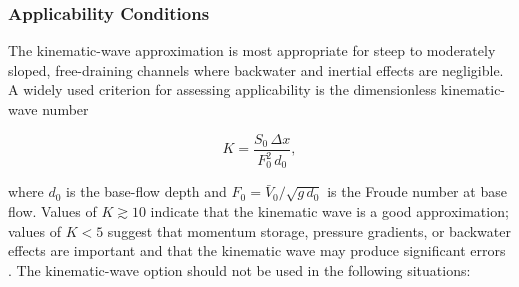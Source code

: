 \subsubsection{Applicability Conditions}

The kinematic-wave approximation is most appropriate for steep to moderately sloped, free-draining channels where backwater and inertial effects are negligible. A widely used criterion for assessing applicability is the dimensionless kinematic-wave number \citep{WoolhiserLiggett1967, PonceLiSimons1978}

\begin{equation}
	\label{eqn:sfr-kw-param}
	K = \frac{S_0 \, \Delta x}{F_0^2 \, d_0} ,
\end{equation}

\noindent where $d_0$ is the base-flow depth and $F_0 = \bar{V}_0 / \sqrt{g\,d_0}$ is the Froude number at base flow. Values of $K \gtrsim 10$ indicate that the kinematic wave is a good approximation; values of $K < 5$ suggest that momentum storage, pressure gradients, or backwater effects are important and that the kinematic wave may produce significant errors \citep{Ponce1991}. The kinematic-wave option should not be used in the following situations:

